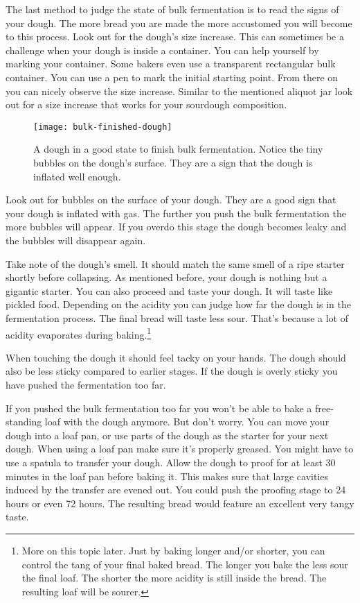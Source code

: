 The last method to judge the state of bulk fermentation
is to read the signs of your dough. The more bread you are
made the more accustomed you will become to this process.
Look out for the dough's size increase. This can sometimes
be a challenge when your dough is inside a container.
You can help yourself by marking your container. Some bakers
even use a transparent rectangular bulk container. You
can use a pen to mark the initial starting point. From there
on you can nicely observe the size increase. Similar to the
mentioned aliquot jar look out for a size increase that works
for your sourdough composition.

\begin{figure}[!htb]
  \texttt{[image: bulk-finished-dough]}
  \caption{A dough in a good state to finish bulk fermentation. Notice
  the tiny bubbles on the dough's surface. They are a sign that the dough
  is inflated well enough.}
\end{figure}

Look out for bubbles on the surface of your dough. They
are a good sign that your dough is inflated with gas. The
further you push the bulk fermentation the more bubbles
will appear. If you overdo this stage the dough becomes leaky and
the bubbles will disappear again.

Take note of the dough's smell. It should match the same
smell of a ripe starter shortly before collapsing. As mentioned
before, your dough is nothing but a gigantic starter. You
can also proceed and taste your dough. It will taste like
pickled food. Depending on the acidity you can judge how
far the dough is in the fermentation process. The final bread
will taste less sour. That's because a lot of acidity evaporates
during baking.\footnote{More on this topic later.
Just by baking longer and/or shorter, you can control
the tang of your final baked bread. The longer
you bake the less sour the final loaf. The shorter
the more acidity is still inside the bread. The resulting
loaf will be sourer.}

When touching the dough it should feel tacky
on your hands. The dough should also be less sticky
compared to earlier stages. If the dough is overly
sticky you have pushed the fermentation too far.

If you pushed the bulk fermentation too far you won't be able
to bake a free-standing loaf with the dough anymore. But don't
worry. You can move your dough into a loaf pan, or use parts
of the dough as the starter for your next dough. When using
a loaf pan make sure it's properly greased. You might have
to use a spatula to transfer your dough. Allow the dough
to proof for at least 30 minutes in the loaf pan before
baking it. This makes sure that large cavities induced
by the transfer are evened out. You could push the proofing
stage to 24 hours or even 72 hours. The resulting
bread would feature an excellent very tangy taste.


